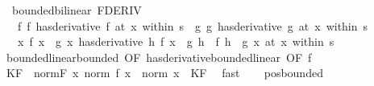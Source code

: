 \begin{isabellebody}
\isamarkupfalse%
\ {\isacharparenleft}{\kern0pt}\ bounded{\isacharunderscore}{\kern0pt}bilinear{\isacharparenright}{\kern0pt}\ FDERIV{\isacharcolon}{\kern0pt}\isanewline
\ \ \ f{\isacharcolon}{\kern0pt}\ {\isachardoublequoteopen}{\isacharparenleft}{\kern0pt}f\ has{\isacharunderscore}{\kern0pt}derivative\ f{\isacharprime}{\kern0pt}{\isacharparenright}{\kern0pt}\ {\isacharparenleft}{\kern0pt}at\ x\ within\ s{\isacharparenright}{\kern0pt}{\isachardoublequoteclose}\ \ g{\isacharcolon}{\kern0pt}\ {\isachardoublequoteopen}{\isacharparenleft}{\kern0pt}g\ has{\isacharunderscore}{\kern0pt}derivative\ g{\isacharprime}{\kern0pt}{\isacharparenright}{\kern0pt}\ {\isacharparenleft}{\kern0pt}at\ x\ within\ s{\isacharparenright}{\kern0pt}{\isachardoublequoteclose}\isanewline
\ \ \ {\isachardoublequoteopen}{\isacharparenleft}{\kern0pt}{\isacharparenleft}{\kern0pt}{\isasymlambda}x{\isachardot}{\kern0pt}\ f\ x\ {\isacharasterisk}{\kern0pt}{\isacharasterisk}{\kern0pt}\ g\ x{\isacharparenright}{\kern0pt}\ has{\isacharunderscore}{\kern0pt}derivative\ {\isacharparenleft}{\kern0pt}{\isasymlambda}h{\isachardot}{\kern0pt}\ f\ x\ {\isacharasterisk}{\kern0pt}{\isacharasterisk}{\kern0pt}\ g{\isacharprime}{\kern0pt}\ h\ {\isacharplus}{\kern0pt}\ f{\isacharprime}{\kern0pt}\ h\ {\isacharasterisk}{\kern0pt}{\isacharasterisk}{\kern0pt}\ g\ x{\isacharparenright}{\kern0pt}{\isacharparenright}{\kern0pt}\ {\isacharparenleft}{\kern0pt}at\ x\ within\ s{\isacharparenright}{\kern0pt}{\isachardoublequoteclose}\isanewline
%
\isadelimproof
%
\endisadelimproof
%
\isatagproof
{}\isamarkupfalse%
\ {\isacharminus}{\kern0pt}\isanewline
\ \ \isamarkupfalse%
\ bounded{\isacharunderscore}{\kern0pt}linear{\isachardot}{\kern0pt}bounded\ {\isacharbrackleft}{\kern0pt}OF\ has{\isacharunderscore}{\kern0pt}derivative{\isacharunderscore}{\kern0pt}bounded{\isacharunderscore}{\kern0pt}linear\ {\isacharbrackleft}{\kern0pt}OF\ f{\isacharbrackright}{\kern0pt}{\isacharbrackright}{\kern0pt}\isanewline
\ \ \isamarkupfalse%
\ KF\ \ norm{\isacharunderscore}{\kern0pt}F{\isacharcolon}{\kern0pt}\ {\isachardoublequoteopen}{\isasymAnd}x{\isachardot}{\kern0pt}\ norm\ {\isacharparenleft}{\kern0pt}f{\isacharprime}{\kern0pt}\ x{\isacharparenright}{\kern0pt}\ {\isasymle}\ norm\ x\ {\isacharasterisk}{\kern0pt}\ KF{\isachardoublequoteclose}\ \isamarkupfalse%
\ fast\isanewline
\isanewline
\ \ \isamarkupfalse%
\ pos{\isacharunderscore}{\kern0pt}bounded\ \isamarkupfalse%

\end{isabellebody}
